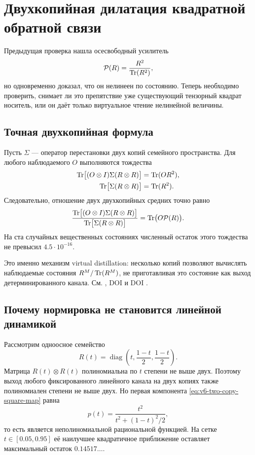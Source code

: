 \chapter{Двухкопийная дилатация квадратной обратной связи}

Предыдущая проверка нашла осесвободный усилитель
\begin{equation}
 \mathcal P(R)=\frac{R^2}{\operatorname{Tr}(R^2)},
 \label{eq:v6-two-copy-square-map}
\end{equation}
но одновременно доказал, что он нелинеен по состоянию. Теперь необходимо
проверить, снимает ли это препятствие уже существующий тензорный квадрат
носитель, или он даёт только виртуальное чтение нелинейной величины.

\section{Точная двухкопийная формула}

Пусть $\Sigma$ --- оператор перестановки двух копий семейного пространства.
Для любого наблюдаемого $O$ выполняются тождества
\begin{align}
 \operatorname{Tr}\bigl[(O\otimes I)\Sigma(R\otimes R)\bigr]&=\operatorname{Tr}(OR^2),\\
 \operatorname{Tr}\bigl[\Sigma(R\otimes R)\bigr]&=\operatorname{Tr}(R^2).
 \label{eq:v6-two-copy-swap-identities}
\end{align}
Следовательно, отношение двух двухкопийных средних точно равно
\begin{equation}
 \frac{\operatorname{Tr}\bigl[(O\otimes I)\Sigma(R\otimes R)\bigr]}
      {\operatorname{Tr}\bigl[\Sigma(R\otimes R)\bigr]}
 =\operatorname{Tr}\bigl(O\mathcal P(R)\bigr).
 \label{eq:v6-two-copy-virtual-state}
\end{equation}
На ста случайных вещественных состояниях численный остаток этого тождества
не превысил $4.5\cdot10^{-16}$.

Это именно механизм virtual distillation: несколько копий позволяют
вычислять наблюдаемые состояния $R^M/\operatorname{Tr}(R^M)$, не приготавливая это
состояние как выход детерминированного канала. См.
, DOI
 и DOI
.

\section{Почему нормировка не становится линейной динамикой}

Рассмотрим одноосное семейство
\begin{equation}
 R(t)=\operatorname{diag}\left(t,\frac{1-t}{2},\frac{1-t}{2}\right).
\end{equation}
Матрица $R(t)\otimes R(t)$ полиномиальна по $t$ степени не выше двух.
Поэтому выход любого фиксированного линейного канала на двух копиях также
полиномиален степени не выше двух. Но первая компонента
\eqref{eq:v6-two-copy-square-map} равна
\begin{equation}
 p(t)=\frac{t^2}{t^2+(1-t)^2/2},
 \end{equation}
то есть является неполиномиальной рациональной функцией. На сетке
$t\in[0.05,0.95]$ её наилучшее квадратичное приближение оставляет
максимальный остаток $0.14517\ldots$.

